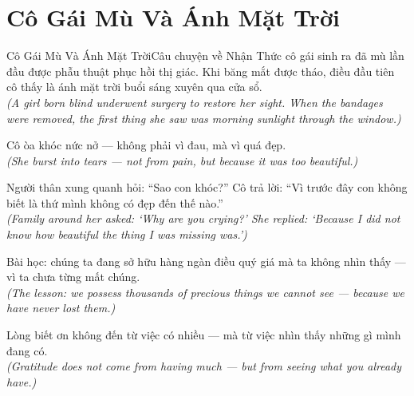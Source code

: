 \section{Cô Gái Mù Và Ánh Mặt Trời}
\begin{truyen}{Cô Gái Mù Và Ánh Mặt Trời}{Câu chuyện về Nhận Thức}
 cô gái sinh ra đã mù lần đầu được phẫu thuật phục hồi thị giác. Khi băng mắt được tháo, điều đầu tiên cô thấy là ánh mặt trời buổi sáng xuyên qua cửa sổ.\\[4pt]
\textit{(A girl born blind underwent surgery to restore her sight. When the bandages were removed, the first thing she saw was morning sunlight through the window.)}

Cô òa khóc nức nở --- không phải vì đau, mà vì quá đẹp.\\[4pt]
\textit{(She burst into tears --- not from pain, but because it was too beautiful.)}

Người thân xung quanh hỏi: ``Sao con khóc?'' Cô trả lời: ``Vì trước đây con không biết là thứ mình không có đẹp đến thế nào.''\\[4pt]
\textit{(Family around her asked: `Why are you crying?' She replied: `Because I did not know how beautiful the thing I was missing was.')}

Bài học: chúng ta đang sở hữu hàng ngàn điều quý giá mà ta không nhìn thấy --- vì ta chưa từng mất chúng.\\[4pt]
\textit{(The lesson: we possess thousands of precious things we cannot see --- because we have never lost them.)}

\end{truyen}
\begin{baihoc}
  Lòng biết ơn không đến từ việc có nhiều --- mà từ việc nhìn thấy những gì mình đang có.\\[4pt]
  \textit{(Gratitude does not come from having much --- but from seeing what you already have.)}
\end{baihoc}

